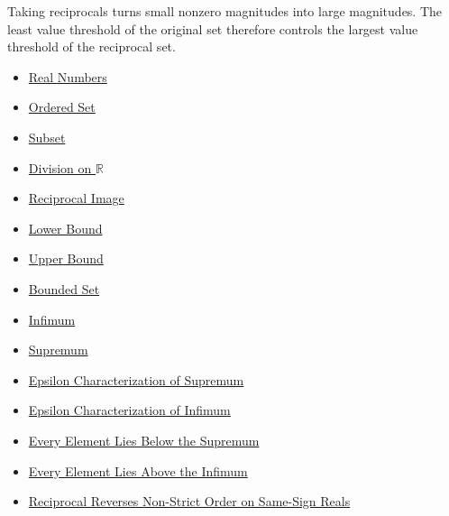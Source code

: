 \begin{remark*}[Interpretation]
Taking reciprocals turns small nonzero magnitudes into large magnitudes.  The
least value threshold of the original set therefore controls the largest value
threshold of the reciprocal set.
\end{remark*}

\begin{dependencies}
\begin{itemize}
  \item \hyperref[def:reals]{Real Numbers}
  \item \hyperref[def:ordered-set]{Ordered Set}
  \item \hyperref[def:subset]{Subset}
  \item \hyperref[def:division-on-r]{Division on $\mathbb{R}$}
  \item \hyperref[def:reciprocal-image]{Reciprocal Image}
  \item \hyperref[def:real-lower-bound]{Lower Bound}
  \item \hyperref[def:real-upper-bound]{Upper Bound}
  \item \hyperref[def:bounded]{Bounded Set}
  \item \hyperref[def:infimum]{Infimum}
  \item \hyperref[def:supremum]{Supremum}
  \item \hyperref[def:epsilon-characterization-of-supremum]{Epsilon Characterization of Supremum}
  \item \hyperref[def:epsilon-characterization-of-infimum]{Epsilon Characterization of Infimum}
  \item \hyperref[prop:every-element-lies-below-the-supremum]{Every Element Lies Below the Supremum}
  \item \hyperref[prop:every-element-lies-above-the-infimum]{Every Element Lies Above the Infimum}
  \item \hyperref[thm:reciprocal-reverses-nonstrict-order-on-same-sign-r]{Reciprocal Reverses Non-Strict Order on Same-Sign Reals}
\end{itemize}
\end{dependencies}



